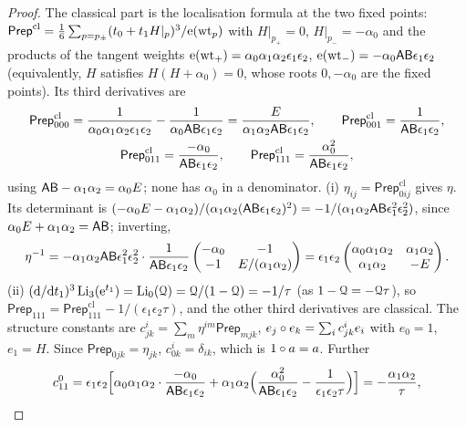 \begin{proof}
The classical part is the localisation formula at the two fixed points: $\mathsf{Prep}^{\mathrm{cl}}=\frac16\sum_{p=p_\pm}(t_0+t_1H|_p)^3/\mathrm{e}(\mathrm{wt}_p)$ with $H|_{p_+}=0$, $H|_{p_-}=-\alpha_0$ and the products of the tangent weights $\mathrm{e}(\mathrm{wt}_+)=\alpha_0\alpha_1\alpha_2\epsilon_1\epsilon_2$, $\mathrm{e}(\mathrm{wt}_-)=-\alpha_0\mathsf{A}\mathsf{B}\epsilon_1\epsilon_2$ (equivalently, $H$ satisfies $H(H+\alpha_0)=0$, whose roots $0,-\alpha_0$ are the fixed points). Its third derivatives are
\[
\begin{gathered}
\mathsf{Prep}^{\mathrm{cl}}_{000}=\frac{1}{\alpha_0\alpha_1\alpha_2\epsilon_1\epsilon_2}-\frac{1}{\alpha_0\mathsf{A}\mathsf{B}\epsilon_1\epsilon_2}=\frac{E}{\alpha_1\alpha_2\mathsf{A}\mathsf{B}\epsilon_1\epsilon_2},\qquad
\mathsf{Prep}^{\mathrm{cl}}_{001}=\frac{1}{\mathsf{A}\mathsf{B}\epsilon_1\epsilon_2},\\
\mathsf{Prep}^{\mathrm{cl}}_{011}=\frac{-\alpha_0}{\mathsf{A}\mathsf{B}\epsilon_1\epsilon_2},\qquad
\mathsf{Prep}^{\mathrm{cl}}_{111}=\frac{\alpha_0^2}{\mathsf{A}\mathsf{B}\epsilon_1\epsilon_2},
\end{gathered}
\]
using $\mathsf{A}\mathsf{B}-\alpha_1\alpha_2=\alpha_0E$; none has $\alpha_0$ in a denominator. (i) $\eta_{ij}=\mathsf{Prep}^{\mathrm{cl}}_{0ij}$ gives $\eta$. Its determinant is $(-\alpha_0E-\alpha_1\alpha_2)/(\alpha_1\alpha_2(\mathsf{A}\mathsf{B}\epsilon_1\epsilon_2)^2)=-1/(\alpha_1\alpha_2\mathsf{A}\mathsf{B}\epsilon_1^2\epsilon_2^2)$, since $\alpha_0E+\alpha_1\alpha_2=\mathsf{A}\mathsf{B}$; inverting,
\[
\eta^{-1}=-\alpha_1\alpha_2\mathsf{A}\mathsf{B}\epsilon_1^2\epsilon_2^2\cdot\frac{1}{\mathsf{A}\mathsf{B}\epsilon_1\epsilon_2}\begin{pmatrix}-\alpha_0&-1\\-1&E/(\alpha_1\alpha_2)\end{pmatrix}=\epsilon_1\epsilon_2\begin{pmatrix}\alpha_0\alpha_1\alpha_2&\alpha_1\alpha_2\\\alpha_1\alpha_2&-E\end{pmatrix}.
\]
(ii) $(\mathrm{d}/\mathrm{d} t_1)^3\operatorname{Li}_3(\mathrm{e}^{t_1})=\operatorname{Li}_0(\mathcal{Q})=\mathcal{Q}/(1-\mathcal{Q})=-1/\tau$ (as $1-\mathcal{Q}=-\mathcal{Q}\tau$), so $\mathsf{Prep}_{111}=\mathsf{Prep}^{\mathrm{cl}}_{111}-1/(\epsilon_1\epsilon_2\tau)$, and the other third derivatives are classical. The structure constants are $c^i_{jk}=\sum_m\eta^{im}\mathsf{Prep}_{mjk}$, $e_j\circ e_k=\sum_ic^i_{jk}e_i$ with $e_0=1$, $e_1=H$. Since $\mathsf{Prep}_{0jk}=\eta_{jk}$, $c^i_{0k}=\delta_{ik}$, which is $1\circ a=a$. Further
\begin{align*}
c^0_{11}&=\epsilon_1\epsilon_2\Big[\alpha_0\alpha_1\alpha_2\cdot\frac{-\alpha_0}{\wA\wB\epsilon_1\epsilon_2}+\alpha_1\alpha_2\Big(\frac{\alpha_0^2}{\wA\wB\epsilon_1\epsilon_2}-\frac{1}{\epsilon_1\epsilon_2\tau}\Big)\Big]=-\frac{\alpha_1\alpha_2}{\tau},\\

\end{align*}
\end{proof}
